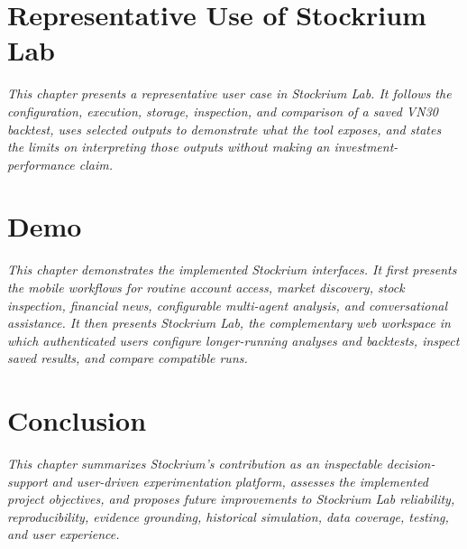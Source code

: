 \documentclass[12pt,a4paper,oneside]{report}
\begin{document}


\clearpage
\chapter{Representative Use of Stockrium Lab}

\textit{This chapter presents a representative user case in Stockrium Lab. It follows the configuration, execution, storage, inspection, and comparison of a saved VN30 backtest, uses selected outputs to demonstrate what the tool exposes, and states the limits on interpreting those outputs without making an investment-performance claim.}







\clearpage
\chapter{Demo}

\textit{This chapter demonstrates the implemented Stockrium interfaces. It first presents the mobile workflows for routine account access, market discovery, stock inspection, financial news, configurable multi-agent analysis, and conversational assistance. It then presents Stockrium Lab, the complementary web workspace in which authenticated users configure longer-running analyses and backtests, inspect saved results, and compare compatible runs.}



\clearpage
\chapter{Conclusion}

\textit{This chapter summarizes Stockrium's contribution as an inspectable decision-support and user-driven experimentation platform, assesses the implemented project objectives, and proposes future improvements to Stockrium Lab reliability, reproducibility, evidence grounding, historical simulation, data coverage, testing, and user experience.}
\end{document}
